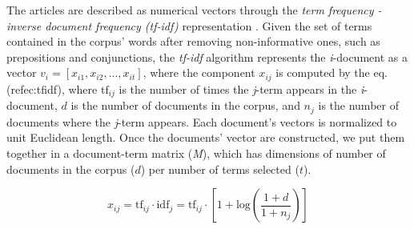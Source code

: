 \documentclass{bmcart}
\begin{document}
\par The articles are described as numerical vectors through the \textit{term frequency - inverse document frequency (tf-idf)} representation \cite{xu2003document}. 
Given the set of terms contained in the corpus' words after removing non-informative ones, such as prepositions and conjunctions, the \textit{tf-idf} algorithm represents the \textit{i}-document as a vector $v_i = [x_{i1}, x_{i2}, ... , x_{it}]$, where the component $x_{ij}$ is computed by the eq.(ref{ec:tfidf}), where $\textrm{tf}_{ij}$ is the number of times the \textit{j}-term appears in the \textit{i}-document, $d$ is the number of documents in the corpus, and $n_j$ is the number of documents where the \textit{j}-term appears. 
Each document's vectors is normalized to unit Euclidean length. Once the documents' vector are constructed, we put them together in a document-term matrix (\emph{M}), which has dimensions of number of documents in the corpus ($d$) per number of terms selected ($t$).

\begin{equation}
x_{ij} = \textrm{tf}_{ij} \cdot \textrm{idf}_{j} = \textrm{tf}_{ij} \cdot [1 + \textrm{log}(\frac{1 + d}{1 + n_j})] 
\label{ec:tfidf}
\end{equation}
\end{document}
